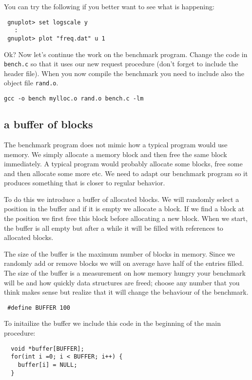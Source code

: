 \documentclass[a4paper,11pt]{article}
\begin{document}
You can try the following if you better want to see what is happening:

\begin{verbatim}
 gnuplot> set logscale y
   :
 gnuplot> plot "freq.dat" u 1
\end{verbatim}

Ok? Now let's continue the work on the benchmark program. Change the
code in {\tt bench.c} so that it uses our new request procedure (don't
forget to include the header file). When you now compile the benchmark you need to include also the object file {\tt rand.o}.

\begin{verbatim}
gcc -o bench mylloc.o rand.o bench.c -lm
\end{verbatim}

\subsection{a buffer of blocks}

The benchmark program does not mimic how a typical program would use
 memory. We simply allocate a memory block and then free the same
block immediately. A typical program would probably allocate some
blocks, free some and then allocate some more etc. We need to adapt
our benchmark program so it produces something that is closer to
regular behavior.

To do this we introduce a buffer of allocated blocks. We will randomly
select a position in the buffer and if it is empty we allocate a
block. If we find a block at the position we first free this block
before allocating a new block. When we start, the buffer is all empty
but after a while it will be filled with references to allocated blocks.

The size of the buffer is the maximum number of blocks in
memory. Since we randomly add or remove blocks we will on average have
half of the entries filled. The size of the buffer is a measurement on
how memory hungry your benchmark will be and how quickly data structures
are freed; choose any number that you think makes sense but realize
that it will change the behaviour of the benchmark.

\begin{lstlisting}
 #define BUFFER 100
\end{lstlisting}

To initailize the buffer we include this code in the beginning of the
main procedure:

\begin{lstlisting}
  void *buffer[BUFFER];
  for(int i =0; i < BUFFER; i++) {
    buffer[i] = NULL;
  }
\end{lstlisting}
\end{document}
